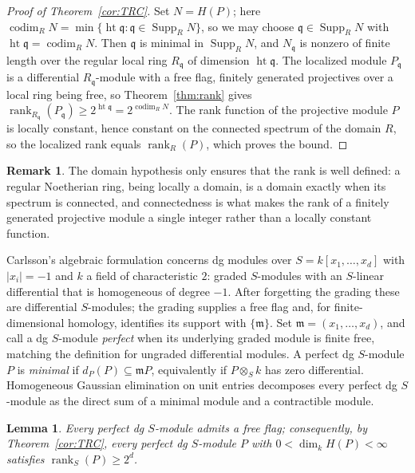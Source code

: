 \documentclass[11pt,reqno]{amsart}
\theoremstyle{plain}
\newtheorem{lemma}[theorem]{Lemma}
\theoremstyle{definition}
\newtheorem{remark}[theorem]{Remark}
\DeclareMathOperator{\rank}{rank}
\DeclareMathOperator{\codim}{codim}
\DeclareMathOperator{\height}{ht}
\DeclareMathOperator{\Supp}{Supp}
\begin{document}
\begin{proof}[Proof of Theorem~\ref{cor:TRC}]
Set $N=H(P)$; here $\codim_RN=\min\{\height\mathfrak q:\mathfrak q\in\Supp_RN\}$, so we may choose
$\mathfrak q\in\Supp_R N$ with $\height\mathfrak q=\codim_R N$.  Then $\mathfrak q$ is minimal in
$\Supp_R N$, and $N_\mathfrak q$ is nonzero of finite length over the regular local ring
$R_\mathfrak q$ of dimension $\height\mathfrak q$.  The localized module $P_\mathfrak q$ is a
differential $R_\mathfrak q$-module with a free flag, finitely generated projectives over a local
ring being free, so Theorem~\ref{thm:rank} gives
$\rank_{R_\mathfrak q}(P_\mathfrak q)\ge2^{\height\mathfrak q}=2^{\codim_RN}$.  The rank function of
the projective module $P$ is locally constant, hence constant on the connected spectrum of the
domain $R$, so the localized rank equals $\rank_R(P)$, which proves the bound.
\end{proof}

\begin{remark}\label{rem:domain}
The domain hypothesis only ensures that the rank is well defined: a regular Noetherian ring, being
locally a domain, is a domain exactly when its spectrum is connected, and connectedness is what
makes the rank of a finitely generated projective module a single integer rather than a locally
constant function.
\end{remark}

Carlsson's algebraic formulation concerns dg modules over $S=k[x_1,\dots,x_d]$ with $|x_i|=-1$ and $k$ a field of
characteristic $2$: graded $S$-modules with an $S$-linear differential that is homogeneous of degree
$-1$.  After forgetting the grading these are differential $S$-modules; the grading supplies a free
flag and, for finite-dimensional homology, identifies its support with
$\{\mathfrak m\}$.  Set $\mathfrak m=(x_1,\dots,x_d)$, and call a dg $S$-module \emph{perfect}
when its underlying graded module is finite free, matching the definition for ungraded differential
modules.  A perfect dg
$S$-module $P$ is \emph{minimal} if $d_P(P)\subseteq\mathfrak m P$, equivalently if $P\otimes_S k$ has
zero differential.  Homogeneous Gaussian elimination on unit entries decomposes every perfect dg
$S$-module as the direct sum of a minimal module and a contractible module.

\begin{lemma}\label{lem:flag}
Every perfect dg $S$-module admits a free flag; consequently, by Theorem~\ref{cor:TRC}, every
perfect dg $S$-module $P$ with $0<\dim_kH(P)<\infty$ satisfies $\rank_S(P)\ge2^{d}$.
\end{lemma}
\end{document}
